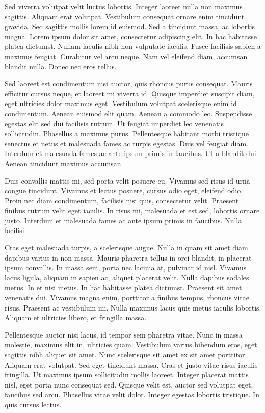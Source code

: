 Sed viverra volutpat velit luctus lobortis. Integer laoreet nulla non maximus sagittis. Aliquam erat volutpat. Vestibulum consequat ornare enim tincidunt gravida. Sed sagittis mollis lorem id euismod. Sed a tincidunt massa, ac lobortis magna. Lorem ipsum dolor sit amet, consectetur adipiscing elit. In hac habitasse platea dictumst. Nullam iaculis nibh non vulputate iaculis. Fusce facilisis sapien a maximus feugiat. Curabitur vel arcu neque. Nam vel eleifend diam, accumsan blandit nulla. Donec nec eros tellus.

Sed laoreet est condimentum nisi auctor, quis rhoncus purus consequat. Mauris efficitur cursus neque, et laoreet mi viverra id. Quisque imperdiet suscipit diam, eget ultricies dolor maximus eget. Vestibulum volutpat scelerisque enim id condimentum. Aenean euismod elit quam. Aenean a commodo leo. Suspendisse egestas elit sed dui facilisis rutrum. Ut feugiat imperdiet leo venenatis sollicitudin. Phasellus a maximus purus. Pellentesque habitant morbi tristique senectus et netus et malesuada fames ac turpis egestas. Duis vel feugiat diam. Interdum et malesuada fames ac ante ipsum primis in faucibus. Ut a blandit dui. Aenean tincidunt maximus accumsan.

Duis convallis mattis mi, sed porta velit posuere eu. Vivamus sed risus id urna congue tincidunt. Vivamus et lectus posuere, cursus odio eget, eleifend odio. Proin nec diam condimentum, facilisis nisi quis, consectetur velit. Praesent finibus rutrum velit eget iaculis. In risus mi, malesuada et est sed, lobortis ornare justo. Interdum et malesuada fames ac ante ipsum primis in faucibus. Nulla facilisi.

Cras eget malesuada turpis, a scelerisque augue. Nulla in quam sit amet diam dapibus varius in non massa. Mauris pharetra tellus in orci blandit, in placerat ipsum convallis. In massa sem, porta nec lacinia at, pulvinar id nisl. Vivamus lacus ligula, aliquam in sapien ac, aliquet placerat velit. Nulla dapibus sodales metus. In et nisi metus. In hac habitasse platea dictumst. Praesent sit amet venenatis dui. Vivamus magna enim, porttitor a finibus tempus, rhoncus vitae risus. Praesent ac vestibulum mi. Nulla maximus lacus quis metus iaculis lobortis. Aliquam et ultricies libero, et fringilla massa.

Pellentesque auctor nisi lacus, id tempor sem pharetra vitae. Nunc in massa molestie, maximus elit in, ultricies quam. Vestibulum varius bibendum eros, eget sagittis nibh aliquet sit amet. Nunc scelerisque sit amet ex sit amet porttitor. Aliquam erat volutpat. Sed eget tincidunt massa. Cras et justo vitae risus iaculis fringilla. Ut maximus ipsum sollicitudin mollis laoreet. Integer placerat mattis nisl, eget porta nunc consequat sed. Quisque velit est, auctor sed volutpat eget, faucibus sed arcu. Phasellus vitae velit dolor. Integer egestas lobortis tristique. In quis cursus lectus.

